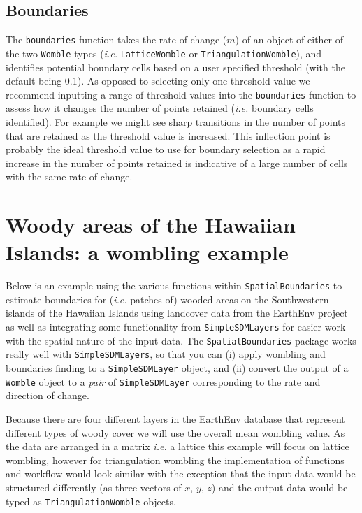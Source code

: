 \subsection{Boundaries}\label{boundaries}

The \texttt{boundaries} function takes the rate of change (\(m\)) of an
object of either of the two \texttt{Womble} types (\emph{i.e.}
\texttt{LatticeWomble} or \texttt{TriangulationWomble}), and identifies
potential boundary cells based on a user specified threshold (with the
default being 0.1). As opposed to selecting only one threshold value we
recommend inputting a range of threshold values into the
\texttt{boundaries} function to assess how it changes the number of
points retained (\emph{i.e.} boundary cells identified). For example we
might see sharp transitions in the number of points that are retained as
the threshold value is increased. This inflection point is probably the
ideal threshold value to use for boundary selection as a rapid increase
in the number of points retained is indicative of a large number of
cells with the same rate of change.

\section{Woody areas of the Hawaiian Islands: a wombling
example}\label{woody-areas-of-the-hawaiian-islands-a-wombling-example}

Below is an example using the various functions within
\texttt{SpatialBoundaries} to estimate boundaries for (\emph{i.e.}
patches of) wooded areas on the Southwestern islands of the Hawaiian
Islands using landcover data from the EarthEnv project
\cite{Tuanmu2014Glo1km} as well as integrating some functionality from
\texttt{SimpleSDMLayers} \cite{Dansereau2021SimJl} for easier work with
the spatial nature of the input data. The \texttt{SpatialBoundaries}
package works really well with \texttt{SimpleSDMLayers}, so that you can
(i) apply wombling and boundaries finding to a \texttt{SimpleSDMLayer}
object, and (ii) convert the output of a \texttt{Womble} object to a
\emph{pair} of \texttt{SimpleSDMLayer} corresponding to the rate and
direction of change.

Because there are four different layers in the EarthEnv database that
represent different types of woody cover we will use the overall mean
wombling value. As the data are arranged in a matrix \emph{i.e.} a
lattice this example will focus on lattice wombling, however for
triangulation wombling the implementation of functions and workflow
would look similar with the exception that the input data would be
structured differently (as three vectors of \(x\), \(y\), \(z\)) and the
output data would be typed as \texttt{TriangulationWomble} objects.

